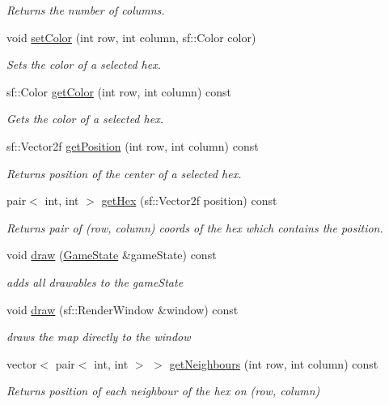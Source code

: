 \begin{DoxyCompactItemize}
\begin{DoxyCompactList}\small\item\em Returns the number of columns. \end{DoxyCompactList}\item 
void \hyperlink{classHexMap_a762097ad75f35ffe7de5e2db716e143f}{set\+Color} (int row, int column, sf\+::\+Color color)
\begin{DoxyCompactList}\small\item\em Sets the color of a selected hex. \end{DoxyCompactList}\item 
sf\+::\+Color \hyperlink{classHexMap_a8c695db928bdbef6854c9a66d7c906af}{get\+Color} (int row, int column) const 
\begin{DoxyCompactList}\small\item\em Gets the color of a selected hex. \end{DoxyCompactList}\item 
sf\+::\+Vector2f \hyperlink{classHexMap_a62255c5a8e3c2063f5000616c80d0caf}{get\+Position} (int row, int column) const 
\begin{DoxyCompactList}\small\item\em Returns position of the center of a selected hex. \end{DoxyCompactList}\item 
pair$<$ int, int $>$ \hyperlink{classHexMap_add0ef8655711db2cd92d0a1b561cfc5e}{get\+Hex} (sf\+::\+Vector2f position) const 
\begin{DoxyCompactList}\small\item\em Returns pair of (row, column) coords of the hex which contains the position. \end{DoxyCompactList}\item 
void \hyperlink{classHexMap_ac6b12f5051efc7bfc1d2d094297948ab}{draw} (\hyperlink{classGameState}{Game\+State} \&game\+State) const 
\begin{DoxyCompactList}\small\item\em adds all drawables to the game\+State \end{DoxyCompactList}\item 
void \hyperlink{classHexMap_ab5b7234db17020e004dd11eef1e71a8c}{draw} (sf\+::\+Render\+Window \&window) const 
\begin{DoxyCompactList}\small\item\em draws the map directly to the window \end{DoxyCompactList}\item 
vector$<$ pair$<$ int, int $>$ $>$ \hyperlink{classHexMap_ab5b3eddce752a5e6c75d71223b289c24}{get\+Neighbours} (int row, int column) const 
\begin{DoxyCompactList}\small\item\em Returns position of each neighbour of the hex on (row, column) \end{DoxyCompactList}\end{DoxyCompactItemize}


